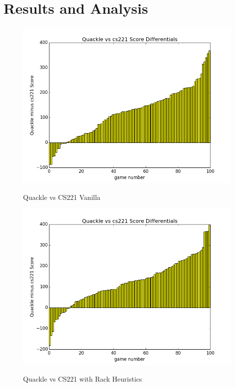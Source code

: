 \documentclass[12pt]{article}
\begin{document}
\section*{Results and Analysis}
\begin{figure}[h]
    \centering
  \includegraphics[scale=0.4]{../images/quacklegame_vanilla_100}
  \caption{Quackle vs CS221 Vanilla}
  \endminipage
      \centering
  \includegraphics[scale=0.4]{../images/quacklegame_rackH_100}\\
   \caption{Quackle vs CS221 with Rack Heuristics}
  \endminipage{}
\end{figure}
\end{document}
